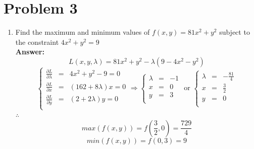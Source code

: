 \documentclass[letterpaper,11pt]{article}
\begin{document}
\newpage

\section*{Problem 3}

\begin{enumerate}
\item Find the maximum and minimum values of $f(x,y) = 81x^2 + y^2$ subject to the constraint $4x^2 + y^2 = 9$\\
\textbf{Answer:}
$$L(x,y,\lambda)=81x^2 + y^2-\lambda(9-4x^2-y^2)$$
\begin{equation}
\nonumber
\left\{\begin{array}{rcl}
\frac{\partial L}{\partial \lambda} & = & 4x^2 + y^2-9 =0 \\
\frac{\partial L}{\partial x} & = & (162+8\lambda)x=0 \\
\frac{\partial L}{\partial y} & = & (2+2\lambda)y=0 \\
\end{array}
\right. \Rightarrow \left\{\begin{array}{rcl}
\lambda & = & -1 \\
x & = & 0 \\
y & = & 3 \\
\end{array}
\right. \text{ or } \left\{\begin{array}{rcl}
\lambda & = & -\frac{81}{4} \\
x & = & \frac{3}{2} \\
y & = & 0 \\
\end{array}
\right.
\end{equation}
$\therefore$
$$max(f(x,y))=f(\frac{3}{2},0)=\frac{729}{4}$$
$$min(f(x,y))=f(0,3)=9$$


\end{enumerate}
\end{document}
